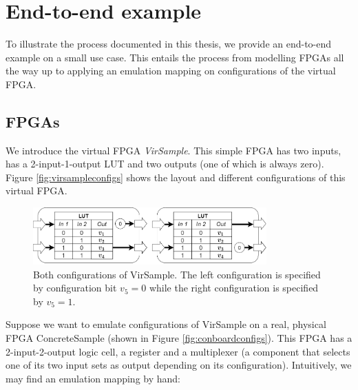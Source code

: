 \chapter{End-to-end example}
To illustrate the process documented in this thesis, we provide an end-to-end example on a small use case. This entails the process from modelling FPGAs all the way up to applying an emulation mapping on configurations of the virtual FPGA.

\section{FPGAs}
We introduce the virtual FPGA \textit{VirSample}. This simple FPGA has two inputs, has a 2-input-1-output LUT and two outputs (one of which is always zero). Figure \ref{fig:virsampleconfigs} shows the layout and different configurations of this virtual FPGA.

\begin{figure}
\centering
\includegraphics[width=0.8\textwidth]{images/endToEnd/exampleFPGA.png}
\caption{Both configurations of VirSample. The left configuration is specified by configuration bit $v_5=0$ while the right configuration is specified by $v_5=1$.}
\label{fig:visampleconfigs}
\end{figure}

Suppose we want to emulate configurations of VirSample on a real, physical FPGA ConcreteSample (shown in Figure \ref{fig:conboardconfigs}). This FPGA has a 2-input-2-output logic cell, a register and a multiplexer (a component that selects one of its two input sets as output depending on its configuration). Intuitively, we may find an emulation mapping by hand:

